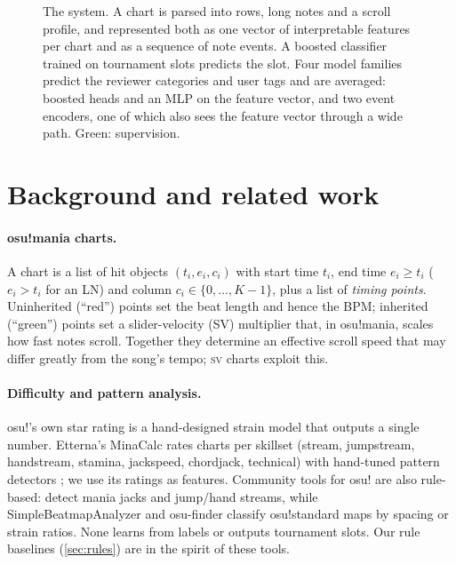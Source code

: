 \documentclass[10pt,twocolumn]{article}
\newcommand{\SV}{\textsc{sv}}
\begin{document}
\begin{figure}[t]
\centering
\resizebox{\textwidth}{!}{}
\caption{The system. A chart is parsed into rows, long notes and a scroll profile, and represented both as one vector of interpretable features per chart and as a sequence of note events. A boosted classifier trained on tournament slots predicts the slot. Four model families predict the reviewer categories and user tags and are averaged: boosted heads and an MLP on the feature vector, and two event encoders, one of which also sees the feature vector through a wide path. Green: supervision.}
\label{fig:pipeline}
\end{figure}

\section{Background and related work}\label{sec:related}

\paragraph{osu!mania charts.} A chart is a list of hit objects $(t_i, e_i, c_i)$ with start time $t_i$, end time $e_i\ge t_i$ ($e_i>t_i$ for an LN) and column $c_i\in\{0,\dots,K-1\}$, plus a list of \emph{timing points}. Uninherited (``red'') points set the beat length and hence the BPM; inherited (``green'') points set a slider-velocity (SV) multiplier that, in osu!mania, scales how fast notes scroll. Together they determine an effective scroll speed that may differ greatly from the song's tempo; \SV{} charts exploit this.

\paragraph{Difficulty and pattern analysis.} osu!'s own star rating is a hand-designed strain model that outputs a single number. Etterna's MinaCalc rates charts per skillset (stream, jumpstream, handstream, stamina, jackspeed, chordjack, technical) with hand-tuned pattern detectors \citep{minacalc}; we use its ratings as features. Community tools for osu! are also rule-based: \citet{rosupattern} detect mania jacks and jump/hand streams, while SimpleBeatmapAnalyzer \citep{simplebeatmap} and osu-finder \citep{osufinder} classify osu!standard maps by spacing or strain ratios. None learns from labels or outputs tournament slots. Our rule baselines (\cref{sec:rules}) are in the spirit of these tools.
\end{document}
